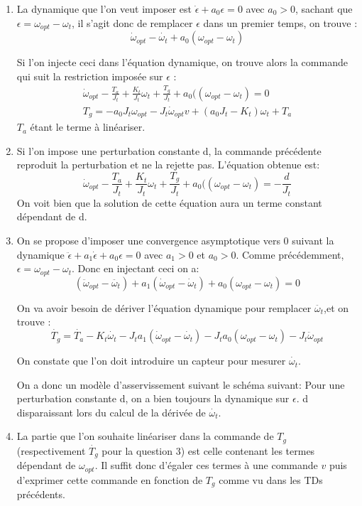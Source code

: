 \documentclass{../../td}{subfiles}
\begin{document}
\begin{enumerate}
\item La dynamique que l'on veut imposer est $\dot{\epsilon} + a_0\epsilon = 0$ avec $a_0 > 0$, sachant que $\epsilon = \omega_{opt} - \omega_t$, il s'agit donc de remplacer $\epsilon$ dans un premier temps, on trouve :
\[\dot{\omega}_{opt} - \dot{\omega_t} + a_0(\omega_{opt} - \omega_t)\]

Si l'on injecte ceci dans l'équation dynamique, on trouve alors la commande qui suit la restriction imposée sur $\epsilon$ :
\begin{align*}
\dot{\omega}_{opt} - \frac{T_a}{J_t} + \frac{K_t}{J_t} \omega_t + \frac{T_g}{J_t} + a_0((\omega_{opt} - \omega_t) = 0\\
T_g = -a_0 J_t\omega_{opt} - J_t \dot{\omega}_{opt}v + (a_0 J_t - K_t)\omega_t + T_a 
\end{align*}
$T_a$ étant le terme à linéariser.

\item Si l'on impose une perturbation constante d, la commande précédente reproduit la perturbation et ne la rejette pas. L'équation obtenue est:
\[\dot{\omega}_{opt} - \frac{T_a}{J_t} + \frac{K_t}{J_t} \omega_t + \frac{T_g}{J_t} + a_0((\omega_{opt} - \omega_t) = - \frac{d}{J_t} \]
On voit bien que la solution de cette équation aura un terme constant dépendant de d.

\item On se propose d'imposer une convergence asymptotique vers 0 suivant la dynamique $\ddot{\epsilon} + a_1\dot{\epsilon} + a_0 \epsilon = 0$ avec $a_1 > 0 $ et $a_0 >0$. Comme précédemment, $\epsilon = \omega_{opt} - \omega_t$. Donc en injectant ceci on a:
\[(\ddot{\omega}_{opt} - \ddot{\omega_t}) + a_1 (\dot{\omega}_{opt} - \dot{\omega}_t) + a_0 (\omega_{opt} - \omega_t) = 0\]

On va avoir besoin de dériver l'équation dynamique pour remplacer $\ddot{\omega_t}$,et on trouve :
\[\dot{T_g} = \dot{T_a} - K_t\dot{\omega_t} - J_t a_1(\dot{\omega}_{opt} - \dot{\omega_t}) - J_ta_0(\omega_{opt} - \omega_t) - J_t \ddot{\omega}_{opt}\]

On constate que l'on doit introduire un capteur pour mesurer $\dot{\omega_t}$.

On a donc un modèle d'asservissement suivant le schéma suivant:
Pour une perturbation constante d, on a bien toujours la dynamique sur $\epsilon$. d disparaissant lors du calcul de la dérivée de $\dot{\omega_t}$.

\item La partie que l'on souhaite linéariser dans la commande de $T_g$ (respectivement $\dot{T_g}$ pour la question 3) est celle contenant les termes dépendant de $\omega_{opt}$. Il suffit donc d'égaler ces termes à une commande $v$ puis d'exprimer cette commande en fonction de $T_g$ comme vu dans les TDs précédents.

\end{enumerate}
\end{document}
